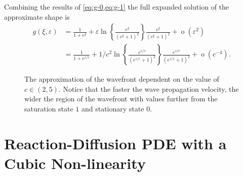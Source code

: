 Combining the results of \cref{eq:g-0,eq:g-1} the full expanded solution of the approximate shape is \begin{equation}
  \label{eq:expanded-solution}
  \begin{aligned}
      g(\xi, \varepsilon) &= \frac{1}{1 + e^{\xi}} + \varepsilon \ln \left\{ \frac{e^{\xi}}{(e^{\xi} + 1)^2} \right\}
    \frac{e^{\xi}}{(e^{\xi} + 1)^2} + \mathop{o}(\varepsilon^2) \\
    &= \frac{1}{1 + e^{z/c}} + 1/c^2 \ln \left\{ \frac{e^{z/c}}{(e^{z/c} + 1)^2} \right\}
    \frac{e^{z/c}}{(e^{z/c} + 1)^2} + \mathop{o}(c^{-4}).
  \end{aligned}
\end{equation}

\begin{figure}[htbp]
    \centering
    
    \caption{
        The approximation of the wavefront dependent on the value of \(c \in (2, 5)\). 
        Notice that the faster the wave propagation velocity, the wider the region of the wavefront with values further
            from the saturation state \(1\) and stationary state \(0\).
    }
    \label{fig:wavefront-profile}
\end{figure}


\section{Reaction-Diffusion \ac{PDE} with a Cubic Non-linearity}%
\label{sec:reaction-diffusion-cubic-nonlin}


